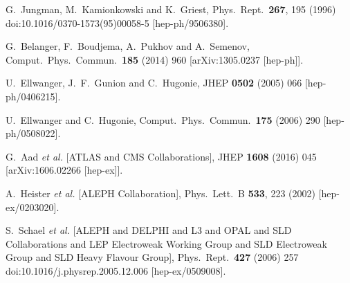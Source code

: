 \documentclass[12pt,twoside]{article}
\begin{document}
\begin{thebibliography}{99}
  G.~Jungman, M.~Kamionkowski and K.~Griest,
  Phys.\ Rept.\  {\bf 267}, 195 (1996)
  doi:10.1016/0370-1573(95)00058-5
  [hep-ph/9506380].
  




  G.~Belanger, F.~Boudjema, A.~Pukhov and A.~Semenov,
  Comput.\ Phys.\ Commun.\  {\bf 185} (2014) 960
  [arXiv:1305.0237 [hep-ph]].
  
  U.~Ellwanger, J.~F.~Gunion and C.~Hugonie,
  JHEP {\bf 0502} (2005) 066
  [hep-ph/0406215].

  U.~Ellwanger and C.~Hugonie,
  Comput.\ Phys.\ Commun.\  {\bf 175} (2006) 290
  [hep-ph/0508022].
  
  G.~Aad {\it et al.} [ATLAS and CMS Collaborations],
  JHEP {\bf 1608} (2016) 045
  [arXiv:1606.02266 [hep-ex]].
  
  A.~Heister {\it et al.} [ALEPH Collaboration],
  Phys.\ Lett.\ B {\bf 533}, 223 (2002)
  [hep-ex/0203020].
  
  S.~Schael {\it et al.} [ALEPH and DELPHI and L3 and OPAL and SLD Collaborations and LEP Electroweak Working Group and SLD Electroweak Group and SLD
Heavy Flavour Group],
  Phys.\ Rept.\  {\bf 427} (2006) 257
  doi:10.1016/j.physrep.2005.12.006
  [hep-ex/0509008].
  

\end{thebibliography}
\end{document}
